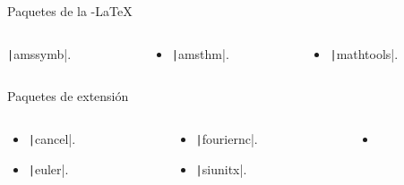 \begin{frame}
\begin{block}{Paquetes de la \AmS-\LaTeX}
\begin{columns}
\begin{column}{.2\paperwidth}
\begin{itemize}
					      \texttt|amssymb|.
				\end{itemize}
			\end{column}
			\begin{column}{.2\paperwidth}
				\begin{itemize}
					\item

					      \texttt|amsthm|.
				\end{itemize}
			\end{column}
			\begin{column}{.2\paperwidth}
				\begin{itemize}
					\item

					      \texttt|mathtools|.
				\end{itemize}
			\end{column}
		\end{columns}
	\end{block}

	\begin{block}{Paquetes de extensión}
		\vspace*{-\baselineskip}\setlength\belowdisplayshortskip{0pt}
		\begin{columns}
			\begin{column}{.2\paperwidth}
				\begin{itemize}
					\item

					      \texttt|cancel|.

					\item

					      \texttt|euler|.
				\end{itemize}
			\end{column}
			\begin{column}{.2\paperwidth}
				\begin{itemize}
					\item

					      \texttt|fouriernc|.

					\item

					      \texttt|siunitx|.
				\end{itemize}
			\end{column}
			\begin{column}{.2\paperwidth}
				\begin{itemize}
					\item


\end{itemize}
\end{column}
\end{columns}
\end{block}
\end{frame}
